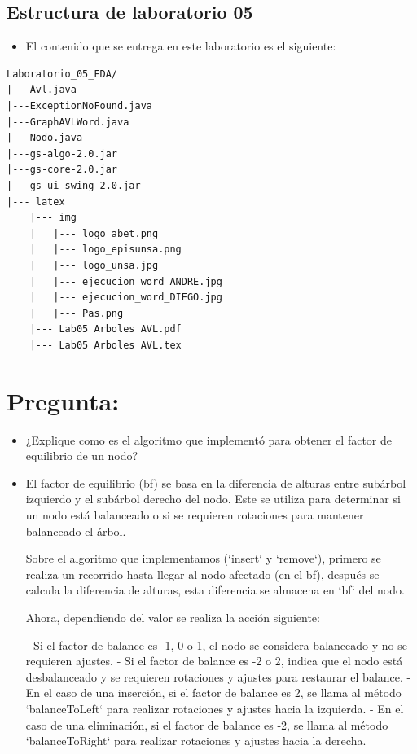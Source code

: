 \documentclass{article}
\begin{document}
	\subsection{Estructura de laboratorio 05}
	\begin{itemize}	
		\item El contenido que se entrega en este laboratorio es el siguiente:
	\end{itemize}
	
\begin{lstlisting}[style=ascii-tree]
Laboratorio_05_EDA/
|---Avl.java
|---ExceptionNoFound.java
|---GraphAVLWord.java
|---Nodo.java
|---gs-algo-2.0.jar
|---gs-core-2.0.jar
|---gs-ui-swing-2.0.jar
|--- latex
    |--- img
    |   |--- logo_abet.png
    |   |--- logo_episunsa.png
    |   |--- logo_unsa.jpg
    |   |--- ejecucion_word_ANDRE.jpg
    |   |--- ejecucion_word_DIEGO.jpg
    |   |--- Pas.png  
    |--- Lab05 Arboles AVL.pdf    
    |--- Lab05 Arboles AVL.tex
\end{lstlisting}    

\section{Pregunta:}
	\begin{itemize}
		\item ¿Explique como es el algoritmo que implementó para obtener el factor de equilibrio de un nodo?
	\item El factor de equilibrio (bf) se basa en la diferencia de alturas entre subárbol izquierdo y el subárbol derecho del nodo. Este se utiliza para determinar si un nodo está balanceado o si se requieren rotaciones para mantener balanceado el árbol.

Sobre el algoritmo que implementamos (`insert` y `remove`), primero se realiza un recorrido hasta llegar al nodo afectado (en el bf), después se calcula la diferencia de alturas, esta diferencia se almacena en `bf` del nodo.

Ahora, dependiendo del valor se realiza la acción siguiente:

- Si el factor de balance es -1, 0 o 1, el nodo se considera balanceado y no se requieren ajustes.
- Si el factor de balance es -2 o 2, indica que el nodo está desbalanceado y se requieren rotaciones y ajustes para restaurar el balance.
- En el caso de una inserción, si el factor de balance es 2, se llama al método `balanceToLeft` para realizar rotaciones y ajustes hacia la izquierda.
- En el caso de una eliminación, si el factor de balance es -2, se llama al método `balanceToRight` para realizar rotaciones y ajustes hacia la derecha.
\end{itemize}
\end{document}
